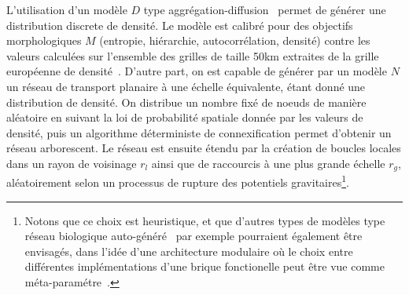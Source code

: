 L'utilisation d'un modèle $D$ type aggrégation-diffusion~\cite{batty2006hierarchy} permet de générer une distribution discrete de densité. Le modèle est calibré pour des objectifs morphologiques $M$ (entropie, hiérarchie, autocorrélation, densité) contre les valeurs calculées sur l'ensemble des grilles de taille 50km extraites de la grille européenne de densité~\cite{eurostat}. %
D'autre part, on est capable de générer par un modèle $N$ un réseau de transport planaire à une échelle équivalente, étant donné une distribution de densité. On distribue un nombre fixé de noeuds de manière aléatoire en suivant la loi de probabilité spatiale donnée par les valeurs de densité, puis un algorithme déterministe de connexification permet d'obtenir un réseau arborescent. Le réseau est ensuite étendu par la création de boucles locales dans un rayon de voisinage $r_l$ ainsi que de raccourcis à une plus grande échelle $r_g$, aléatoirement selon un processus de rupture des potentiels gravitaires\footnote{Notons que ce choix est heuristique, et que d'autres types de modèles type réseau biologique auto-généré~\cite{tero2006physarum} par exemple pourraient également être envisagés, dans l'idée d'une architecture modulaire où le choix entre différentes implémentations d'une brique fonctionelle peut être vue comme méta-paramétre~\cite{cottineau2015incremental}.}.
